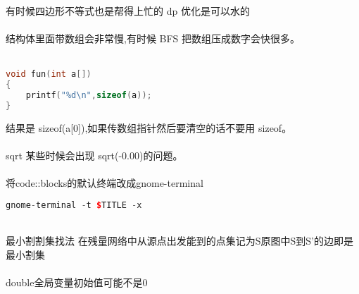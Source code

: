 	有时候四边形不等式也是帮得上忙的 dp 优化是可以水的\\
	\\
	结构体里面带数组会非常慢,有时候 BFS 把数组压成数字会快很多。\\
	\\
	\begin{lstlisting}[language=c++,
    basicstyle=\sf\Large,
    numberstyle=\sf\Large,
    commentstyle=\sf\Large]
void fun(int a[])
{
	printf("%d\n",sizeof(a));
}
	\end{lstlisting}
	结果是 sizeof(a[0]),如果传数组指针然后要清空的话不要用 sizeof。\\
	\\
	sqrt 某些时候会出现 sqrt(-0.00)的问题。\\
	\\
	将code::blocks的默认终端改成gnome-terminal
	\begin{lstlisting}[language=c++,
    basicstyle=\sf\Large,
    numberstyle=\sf\Large,
    commentstyle=\sf\Large]
gnome-terminal -t $TITLE -x
	\end{lstlisting}
	~\\
	最小割割集找法 在残量网络中从源点出发能到的点集记为S原图中S到S’的边即是最小割集\\
	\\
	double全局变量初始值可能不是$0$\\
	\normalsize